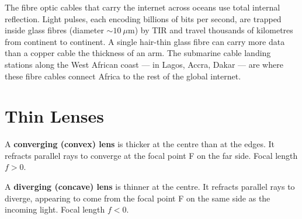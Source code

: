 \begin{realworldbox}
The fibre optic cables that carry the internet
across oceans use total internal reflection. Light
pulses, each encoding billions of bits per second,
are trapped inside glass fibres (diameter $\sim 10\
\mu\text{m}$) by TIR and travel thousands of
kilometres from continent to continent. A single
hair-thin glass fibre can carry more data than a
copper cable the thickness of an arm. The submarine
cable landing stations along the West African
coast --- in Lagos, Accra, Dakar --- are where
these fibre cables connect Africa to the rest of
the global internet.
\end{realworldbox}

\section{Thin Lenses}

\begin{definitionbox}
A \textbf{converging (convex) lens} is thicker at
the centre than at the edges. It refracts parallel
rays to converge at the focal point F on the
far side. Focal length $f > 0$.

A \textbf{diverging (concave) lens} is thinner at
the centre. It refracts parallel rays to diverge,
appearing to come from the focal point F on the
same side as the incoming light. Focal length $f < 0$.
\end{definitionbox}

